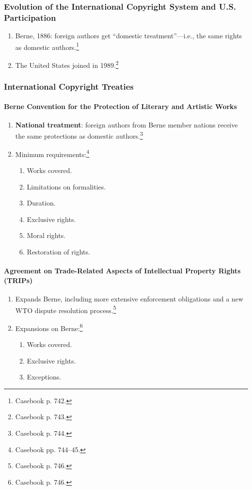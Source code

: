 \subsubsection{Evolution of the International Copyright System and U.S. 
Participation}

\begin{enumerate}
    \item Berne, 1886: foreign authors get ``domestic treatment''---i.e., the 
    same rights as domestic authors.\footnote{Casebook p. 742.}
    \item The United States joined in 1989.\footnote{Casebook p. 743.}
\end{enumerate}

\subsubsection{International Copyright Treaties}

\paragraph{Berne Convention for the Protection of Literary and Artistic Works}

\begin{enumerate}
    \item \textbf{National treatment}: foreign authors from Berne member 
    nations receive the same protections as domestic 
    authors.\footnote{Casebook p. 744.}
    \item Minimum requirements:\footnote{Casebook pp. 744--45.}
    \begin{enumerate}
        \item Works covered.
        \item Limitations on formalities.
        \item Duration.
        \item Exclusive rights.
        \item Moral rights.
        \item Restoration of rights.
    \end{enumerate}
\end{enumerate}

\paragraph{Agreement on Trade-Related Aspects of Intellectual Property Rights 
(TRIPs)}

\begin{enumerate}
    \item Expands Berne, including more extensive enforcement obligations and 
    a new WTO dispute resolution process.\footnote{Casebook p. 746.}
    \item Expansions on Berne:\footnote{Casebook p. 746.}
    \begin{enumerate}
        \item Works covered.
        \item Exclusive rights.
        \item Exceptions.
    \end{enumerate}
\end{enumerate}

